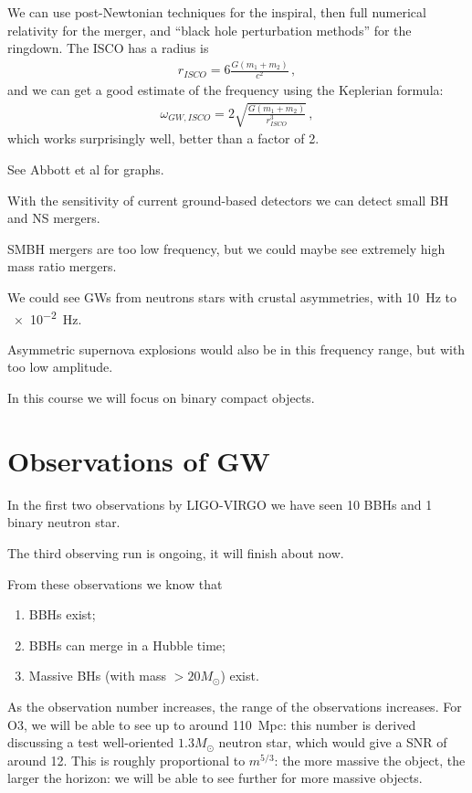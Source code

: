 \documentclass[main.tex]{subfiles}
\begin{document}
We can use post-Newtonian techniques for the inspiral, then full numerical relativity for the merger, and ``black hole perturbation methods'' for the ringdown. 
The ISCO has a radius is 
%
\begin{align}
r_{ISCO} = 6 \frac{G (m_1 + m_2 )}{c^2}
\,,
\end{align}
%
and we can get a good estimate of the frequency using the Keplerian formula: 
%
\begin{align}
\omega_{GW, ISCO} = 2 \sqrt{ \frac{G (m_1 + m_2 )}{r_{ISCO}^3}}
\,,
\end{align}
%
which works surprisingly well, better than a factor of 2. 

See Abbott et al \cite[]{ligoscientificcollaborationandvirgocollaborationObservationGravitationalWaves2016} for graphs. 

With the sensitivity of current ground-based detectors we can detect small BH and NS mergers. 

SMBH mergers are too low frequency, but we could maybe see extremely high mass ratio mergers. 

We could see GWs from neutrons stars with crustal asymmetries, with \SI{10}{Hz} to \SI{e-2}{Hz}.

Asymmetric supernova explosions would also be in this frequency range, but with too low amplitude. 

In this course we will focus on binary compact objects. 

\section{Observations of GW}

In the first two observations by LIGO-VIRGO we have seen 10 BBHs and 1 binary neutron star. 

The third observing run is ongoing, it will finish about now. 

From these observations we know that 
\begin{enumerate}
  \item BBHs exist;
  \item BBHs can merge in a Hubble time;
  \item Massive BHs (with mass \(>20  M_{\odot}\)) exist.
\end{enumerate}

As the observation number increases, the range of the observations increases. For O3, we will be able to see up to around \SI{110}{Mpc}: this number is derived discussing a test well-oriented \(1.3 M_{\odot}\) neutron star, which would give a SNR of around 12. 
This is roughly proportional to \(m^{5/3}\): the more massive the object, the larger the horizon: we will be able to see further for more massive objects. 
\end{document}
